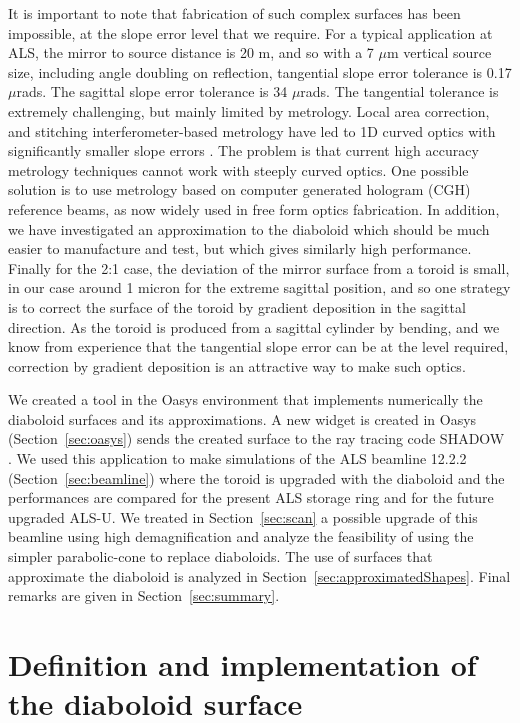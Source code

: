 \documentclass{iucr}              %
\begin{document}
It is important to note that fabrication of such complex surfaces has been impossible, at the slope error level that we require.  For a typical application at ALS, the mirror to source distance is 20 m, and so with a 7 $\mu$m vertical source size, including angle doubling on reflection,  tangential slope error tolerance is 0.17 $\mu$rads.  The sagittal slope error tolerance is 34 $\mu$rads.  The tangential tolerance is extremely challenging, but mainly limited by metrology.  Local area correction, and stitching interferometer-based metrology have led to 1D curved optics with significantly smaller slope errors \cite{Yamauchi2002}.  The problem is that current high accuracy metrology techniques cannot work with steeply curved optics.  One possible solution is to use metrology based on computer generated hologram (CGH) reference beams, as now widely used in free form optics fabrication. In addition, we have investigated an approximation to the diaboloid which should be much easier to manufacture and test, but which gives similarly high performance. Finally for the 2:1 case, the deviation of the mirror surface from a toroid is small, in our case around 1 micron for the extreme sagittal position, and so one strategy is to correct the surface of the toroid by gradient deposition in the sagittal direction. As the toroid is produced from a sagittal cylinder by bending, and we know from experience that the tangential slope error can be at the level required, correction by gradient deposition is an attractive way to make such optics. 

We created a tool in the Oasys environment \cite{codeOASYS} that implements numerically the diaboloid surfaces and its approximations. A new widget is created in Oasys (Section~\ref{sec:oasys}) sends the created surface to the ray tracing code SHADOW \cite{codeSHADOW}. We used this application to make simulations of the ALS beamline 12.2.2 (Section~\ref{sec:beamline}) where the toroid is upgraded with the diaboloid and the performances are compared for the present ALS storage ring and for the future upgraded ALS-U. We treated in Section~\ref{sec:scan} a possible upgrade of this beamline using high demagnification and analyze the feasibility of using the simpler parabolic-cone to replace diaboloids. The use of surfaces that approximate the diaboloid is analyzed in Section~\ref{sec:approximatedShapes}. Final remarks are given in Section~\ref{sec:summary}.


\section{Definition and implementation of the diaboloid surface}
\label{sec:DiaboloidEqs}
\end{document}
